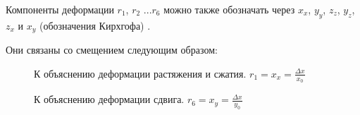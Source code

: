 Компоненты деформации  $r_1$, $r_2$ ...$r_6$ можно также обозначать  через $x_x$, $y_y$, $z_z$,
$y_z$, $z_x$ и $x_y$ (обозначения Кирхгофа)  \cite{kedi_1949}.

Они связаны со смещением следующим образом:
\begin{figure}[H]
  \centering
  \hfill
  \caption{К объяснению деформации растяжения и сжатия. $r_1= x_x = \frac{\Delta x}{x_0} $}
  \label{ris:}
\end{figure}

\begin{figure}[H]
  \centering
  \hfill
  \caption{К объяснению деформации сдвига. $r_6= x_y = \frac{\Delta x}{y_0} $}
  \label{ris:x_y_2d}
\end{figure}


